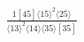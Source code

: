 \documentclass[varwidth, border=5pt]{standalone}
\begin{document}
\begin{my}
$\begin{gathered}
\scriptscriptstyle\frac{1[45]⟨15⟩^2⟨25⟩}{⟨13⟩^2⟨14⟩⟨35⟩[35]}
\end{gathered}$
\end{my}
\end{document}
